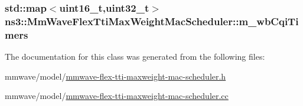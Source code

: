 \subsubsection[{\texorpdfstring{m\+\_\+wb\+Cqi\+Timers}{m_wbCqiTimers}}]{\setlength{\rightskip}{0pt plus 5cm}std\+::map$<$uint16\+\_\+t,uint32\+\_\+t$>$ ns3\+::\+Mm\+Wave\+Flex\+Tti\+Max\+Weight\+Mac\+Scheduler\+::m\+\_\+wb\+Cqi\+Timers\hspace{0.3cm}{\ttfamily [private]}}\hypertarget{classns3_1_1MmWaveFlexTtiMaxWeightMacScheduler_ae5d8e61af9fd27ffd79a17f068267f42}{}\label{classns3_1_1MmWaveFlexTtiMaxWeightMacScheduler_ae5d8e61af9fd27ffd79a17f068267f42}


The documentation for this class was generated from the following files\+:\begin{DoxyCompactItemize}
\item 
mmwave/model/\hyperlink{mmwave-flex-tti-maxweight-mac-scheduler_8h}{mmwave-\/flex-\/tti-\/maxweight-\/mac-\/scheduler.\+h}\item 
mmwave/model/\hyperlink{mmwave-flex-tti-maxweight-mac-scheduler_8cc}{mmwave-\/flex-\/tti-\/maxweight-\/mac-\/scheduler.\+cc}\end{DoxyCompactItemize}
